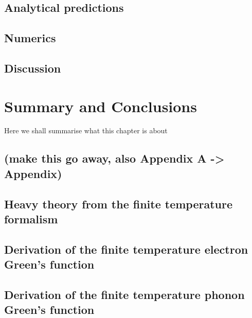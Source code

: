 \documentclass[12pt]{report}
\newcommand{\todo}[1]{{\leavevmode\color{todo}#1}}
\begin{document}
\section{Analytical predictions}

\section{Numerics}

\section{Discussion}


\chapter{Summary and Conclusions}
\todo{Here we shall summarise what this chapter is about}


\begin{appendices}
\chapter{(make this go away, also Appendix A -> Appendix)}

\section{Heavy theory from the finite temperature formalism}

\section{Derivation of the finite temperature electron Green's function}

\section{Derivation of the finite temperature phonon Green's function}
\end{appendices}



\end{document}
